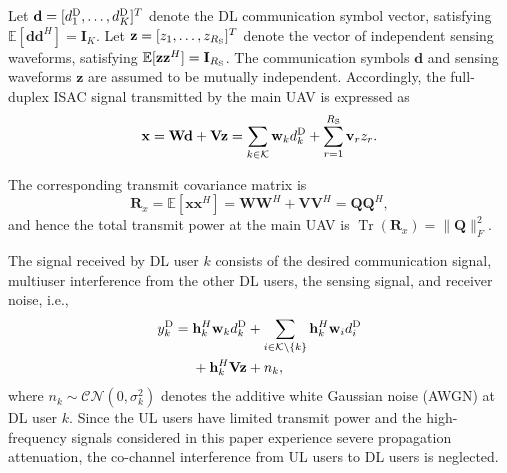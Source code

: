 \documentclass[letterpaper,journal]{IEEEtran}
\begin{document}
Let $\mathbf d=[d_1^{\rm D},\ldots,d_K^{\rm D}]^T$ denote the DL communication symbol vector, satisfying $\mathbb E[\mathbf d\mathbf d^H]=\mathbf I_K$. Let $\mathbf z=[z_1,\ldots,z_{R_{\rm S}}]^T$ denote the vector of independent sensing waveforms, satisfying $\mathbb E[\mathbf z\mathbf z^H]=\mathbf I_{R_{\rm S}}$. The communication symbols $\mathbf d$ and sensing waveforms $\mathbf z$ are assumed to be mutually independent. Accordingly, the full-duplex ISAC signal transmitted by the main UAV is expressed as
\begin{equation}
\mathbf x
=
\mathbf W\mathbf d+\mathbf V\mathbf z
=
\sum_{k\in\mathcal K}\mathbf w_kd_k^{\rm D}
+
\sum_{r=1}^{R_{\rm S}}\mathbf v_rz_r.
\label{eq:transmit_signal}
\end{equation}

The corresponding transmit covariance matrix is
\begin{equation}
\mathbf R_x
=
\mathbb E[\mathbf x\mathbf x^H]
=
\mathbf W\mathbf W^H
+
\mathbf V\mathbf V^H
=
\mathbf Q\mathbf Q^H,
\label{eq:tx_covariance}
\end{equation}
and hence the total transmit power at the main UAV is $\operatorname{Tr}(\mathbf R_x)=\|\mathbf Q\|_F^2$.

The signal received by DL user $k$ consists of the desired communication signal, multiuser interference from the other DL users, the sensing signal, and receiver noise, i.e.,
\begin{equation}
\begin{aligned}
y_k^{\rm D}
={}&
\mathbf h_k^H\mathbf w_kd_k^{\rm D}
+
\sum_{i\in\mathcal K\setminus\{k\}}
\mathbf h_k^H\mathbf w_i d_i^{\rm D}
\\
&+
\mathbf h_k^H\mathbf V\mathbf z
+
n_k,
\end{aligned}
\label{eq:dl_received_signal}
\end{equation}
where $n_k\sim\mathcal{CN}(0,\sigma_k^2)$ denotes the additive white Gaussian noise (AWGN) at DL user $k$. Since the UL users have limited transmit power and the high-frequency signals considered in this paper experience severe propagation attenuation, the co-channel interference from UL users to DL users is neglected.
\end{document}
